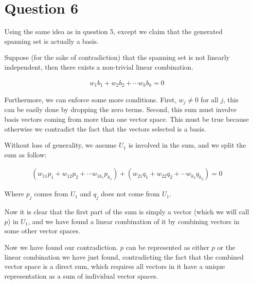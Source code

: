 \section*{Question 6}
Using the same idea as in question 5, except we claim that the generated spanning set is actually a basis.

Suppose (for the sake of contradiction) that the spanning set is not linearly independent, then there exists a non-trivial linear combination. 

\begin{eqnarray*}
    w_1 b_1 + w_2 b_2 + \cdots w_k b_k = 0
\end{eqnarray*}

Furthermore, we can enforce some more conditions. First, $ w_j \ne 0 $ for all $ j $, this can be easily done by dropping the zero terms. Second, this sum must involve basis vectors coming from more than one vector space. This must be true because otherwise we contradict the fact that the vectors selected is a basis.

Without loss of generality, we assume $ U_1 $ is involved in the sum, and we split the sum as follow:

\begin{eqnarray*}
    (w_{11} p_1 + w_{12} p_2 + \cdots w_{1k_1} p_{k_1}) + (w_{21} q_1 + w_{22} q_2 + \cdots w_{k_2} q_{k_2}) = 0
\end{eqnarray*}

Where $ p_j $ comes from $ U_1 $ and $ q_j $ does not come from $ U_1 $.

Now it is clear that the first part of the sum is simply a vector (which we will call $ p $) in $ U_1 $, and we have found a linear combination of it by combining vectors in some other vector spaces.

Now we have found our contradiction. $ p $ can be represented as either $ p $ or the linear combination we have just found, contradicting the fact that the combined vector space is a direct sum, which requires all vectors in it have a unique representation as a sum of individual vector spaces.